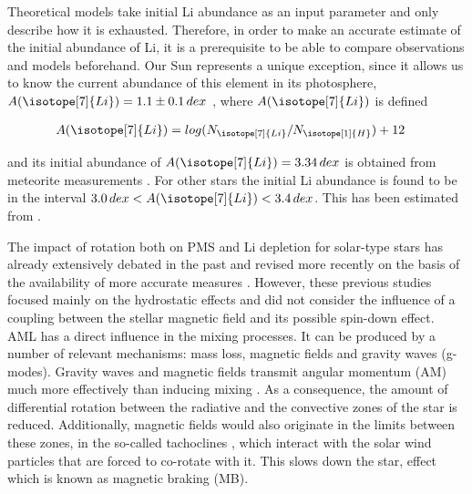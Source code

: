 \documentclass[fleqn,usenatbib]{mnras}
\begin{document}
Theoretical models take initial Li abundance as an input parameter and only describe how it is exhausted. Therefore, in order to make an accurate estimate of the initial abundance of Li, it is a prerequisite to be able to compare observations and models beforehand. Our Sun represents a unique exception, since it allows us to know the current abundance of this element in its photosphere, $A(\isotope[7]{Li}) = 1.1 \pm 0.1 \, dex$ \citep{Jeffries2004}, where $A(\isotope[7]{Li})$ is defined


\begin{ceqn}
\begin{align}
    A(\isotope[7]{Li}) &= log(N_{\isotope[7]{Li}} / N_{\isotope[1]{H}}) + 12
    \label{eq:A_Li}
\end{align}
\end{ceqn}

and its initial abundance of $A(\isotope[7]{Li}) = 3.34 \, dex$ is obtained from meteorite measurements \citep{Randich2006}. For other stars the initial Li abundance is found to be in the interval $3.0 \, dex < A(\isotope[7]{Li}) < 3.4 \, dex$. This has been estimated from  \citet{Randich2006}.\par

The impact of rotation both on PMS and Li depletion for solar-type stars has already extensively debated in the past \citep{Pinsonneault1997,Jeffries2004,Somers2014} and revised more recently on the basis of the availability of more accurate measures \citep{Bouvier2016}. However, these previous studies focused mainly on the hydrostatic effects and did not consider the influence of a coupling between the stellar magnetic field and its possible spin-down effect. AML has a direct influence in the mixing processes. It can be produced by a number of relevant mechanisms: mass loss, magnetic fields and gravity waves (g-modes). Gravity waves \citep{Charbonnel2005} and magnetic fields \citep{Eggenberger2009} transmit angular momentum (AM) much more effectively than inducing mixing \citep{Denissenkov2007}. As a consequence, the amount of differential rotation between the radiative and the convective zones of the star is reduced. Additionally, magnetic fields would also originate in the limits between these zones, in the so-called tachoclines \citep{Aschwanden2014, Guerrero2016}, which interact with the solar wind particles that are forced to co-rotate with it. This slows down the star, effect which is known as magnetic braking (MB). \par
\end{document}
